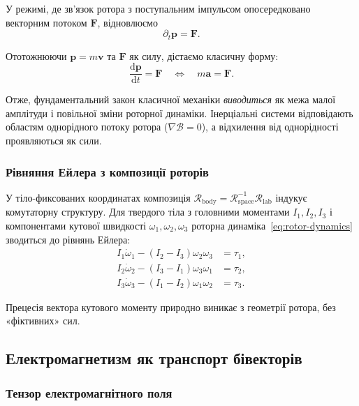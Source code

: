 \documentclass[11pt,a4paper]{article}
\newcommand{\Rotor}{\mathcal{R}}
\newcommand{\Biv}{\mathcal{B}}
\newcommand{\D}{\nabla}                        %
\theoremstyle{definition}
\theoremstyle{plain}
\theoremstyle{remark}
\begin{document}
У режимі, де зв’язок ротора з поступальним імпульсом опосередковано векторним потоком $\mathbf{F}$, відновлюємо
\begin{equation}
\partial_t \mathbf{p} = \mathbf{F}.
\label{eq:newton-translational}
\end{equation}

Ототожнюючи $\mathbf{p} = m\mathbf{v}$ та $\mathbf{F}$ як силу, дістаємо класичну форму:
\begin{equation}
\boxed{\frac{\mathrm{d}\mathbf{p}}{\mathrm{d}t} = \mathbf{F} \quad \Longleftrightarrow \quad m\mathbf{a} = \mathbf{F}.}
\label{eq:newton-final}
\end{equation}

Отже, фундаментальний закон класичної механіки \emph{виводиться} як межа малої амплітуди і повільної зміни роторної динаміки. Інерціальні системи відповідають областям однорідного потоку ротора ($\D\Biv = 0$), а відхилення від однорідності проявляються як сили.

\subsubsection{Рівняння Ейлера з композиції роторів}

У тіло-фиксованих координатах композиція $\Rotor_{\text{body}} = \Rotor_{\text{space}}^{-1} \Rotor_{\text{lab}}$ індукує комутаторну структуру. Для твердого тіла з головними моментами $I_1, I_2, I_3$ і компонентами кутової швидкості $\omega_1, \omega_2, \omega_3$ роторна динаміка~\eqref{eq:rotor-dynamics} зводиться до рівнянь Ейлера:
\begin{align}
I_1 \dot{\omega}_1 - (I_2 - I_3)\omega_2\omega_3 &= \tau_1, \\
I_2 \dot{\omega}_2 - (I_3 - I_1)\omega_3\omega_1 &= \tau_2, \\
I_3 \dot{\omega}_3 - (I_1 - I_2)\omega_1\omega_2 &= \tau_3.
\end{align}

Прецесія вектора кутового моменту природно виникає з геометрії ротора, без «фіктивних» сил.

\subsection{Електромагнетизм як транспорт бівекторів}

\subsubsection{Тензор електромагнітного поля}
\end{document}
